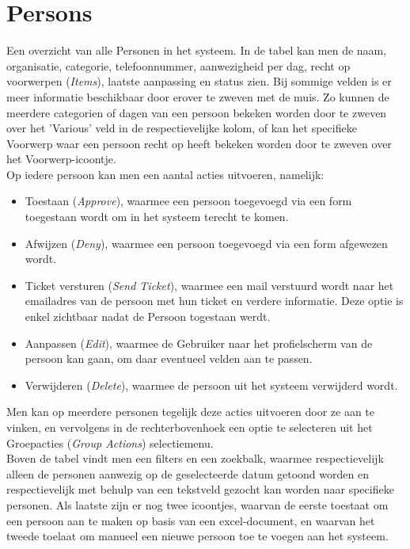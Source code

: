 \documentclass[]{memoir}
\begin{document}
\section{Persons} \label{Persons}
Een overzicht van alle Personen in het systeem. In de tabel kan men de naam, organisatie, categorie, telefoonnummer, aanwezigheid per dag, recht op voorwerpen (\textsl{Items}), laatste aanpassing en status zien. Bij sommige velden is er meer informatie beschikbaar door erover te zweven met de muis. Zo kunnen de meerdere categorien of dagen van een persoon bekeken worden door te zweven over het 'Various' veld in de respectievelijke kolom, of kan het specifieke Voorwerp waar een persoon recht op heeft bekeken worden door te zweven over het Voorwerp-icoontje.\\
Op iedere persoon kan men een aantal acties uitvoeren, namelijk:
\begin{itemize}
	\item Toestaan (\textsl{Approve}), waarmee een persoon toegevoegd via een form toegestaan wordt om in het systeem terecht te komen.
	\item Afwijzen  (\textsl{Deny}), waarmee een persoon toegevoegd via een form afgewezen wordt.
	\item Ticket versturen (\textsl{Send Ticket}), waarmee een mail verstuurd wordt naar het emailadres van de persoon met hun ticket en verdere informatie. Deze optie is enkel zichtbaar nadat de Persoon togestaan werdt.
	\item Aanpassen (\textsl{Edit}), waarmee de Gebruiker naar het profielscherm van de persoon kan gaan, om daar eventueel velden aan te passen.
	\item Verwijderen (\textsl{Delete}), waarmee de persoon uit het systeem verwijderd wordt.
\end{itemize}

Men kan op meerdere personen tegelijk deze acties uitvoeren door ze aan te vinken, en vervolgens in de rechterbovenhoek een optie te selecteren uit het Groepacties  (\textsl{Group Actions}) selectiemenu.\\
Boven de tabel vindt men een filters en een zoekbalk, waarmee respectievelijk alleen de personen aanwezig op de geselecteerde datum getoond worden en respectievelijk met behulp van een tekstveld gezocht kan worden naar specifieke personen. Als laatste zijn er nog twee icoontjes, waarvan de eerste toestaat om een persoon aan te maken op basis van een excel-document, en waarvan het tweede toelaat om manueel een nieuwe persoon toe te voegen aan het systeem.\\
\end{document}
